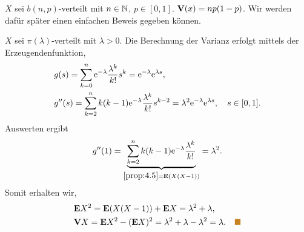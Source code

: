 \begin{bsp}
$X$ sei $b(n,p)$-verteilt mit $n\in \mathbb{N}$, $p \in [0,1]$. 
$\textbf{V}(x)=np(1-p)$. Wir werden dafür später einen einfachen Beweis gegeben
können.\bsphere
\end{bsp}
\begin{bsp}
$X$ sei $\pi(\lambda)$-verteilt mit $\lambda >0$.
Die Berechnung der Varianz erfolgt mittels der Erzeugendenfunktion,
\begin{align*}
&g(s) = \sum\limits_{k=0}^n \mathrm{e}^{-\lambda} \frac{\lambda^k}{k!} s^k
= \mathrm{e}^{-\lambda}\mathrm{e}^{\lambda s},\\
&g''(s) = \sum\limits_{k=2}^n k(k-1)\mathrm{e}^{-\lambda} \frac{\lambda^k}{k!} s^{k-2}
= \lambda^2\mathrm{e}^{-\lambda}\mathrm{e}^{\lambda s},\quad s\in[0,1].
\end{align*}
Auswerten ergibt
\begin{align*}
g''(1) = \underbrace{\sum\limits_{k=2}^n k(k-1)\mathrm{e}^{-\lambda}
\frac{\lambda^k}{k!}}_{\ref{prop:4.5} = \textbf{E}(X(X-1))}
= \lambda^2.
\end{align*}
Somit erhalten wir,
\begin{align*}
&\E X^2 = \E(X(X-1)) + \E X = \lambda^2 + \lambda,\\
&\V X = \E X^2 - (\E X)^2 = \lambda^2 + \lambda - \lambda^2 = \lambda.\bsphere
\end{align*}
\end{bsp}
